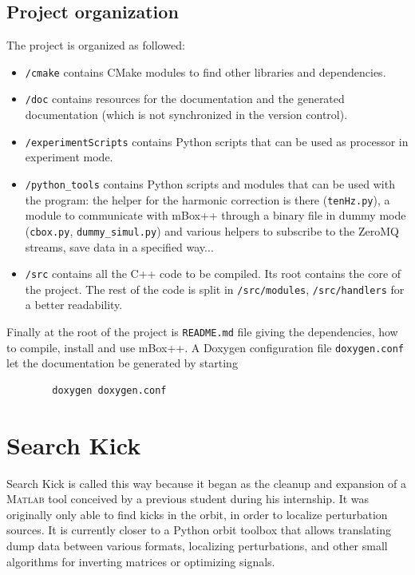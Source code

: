 \section{Project organization}
The project is organized as followed:
\begin{itemize}
    \item \texttt{/cmake} contains CMake modules to find other libraries and dependencies.
    \item \texttt{/doc} contains resources for the documentation and the generated documentation (which is not synchronized in the version control).
    \item \texttt{/experimentScripts} contains Python scripts that can be used as processor in experiment mode.
    \item \texttt{/python\_tools} contains Python scripts and modules that can be used with the program: the helper for the harmonic correction is there (\texttt{tenHz.py}), a module to communicate with mBox++ through a binary file in dummy mode (\texttt{cbox.py}, \texttt{dummy\_simul.py}) and various helpers to subscribe to the ZeroMQ streams, save data in a specified way...
    \item \texttt{/src} contains all the C++ code to be compiled. Its root contains the core of the project. The rest of the code is split in \texttt{/src/modules}, \texttt{/src/handlers} for a better readability.     
    \end{itemize}
    Finally at the root of the project is \texttt{README.md} file giving the dependencies, how to compile, install and use mBox++. A Doxygen configuration file \texttt{doxygen.conf} let the documentation be generated by starting
    \begin{verbatim}
        doxygen doxygen.conf
    \end{verbatim}
    
\chapter{Search Kick}
Search Kick is called this way because it began as the cleanup and expansion of a \textsc{Matlab} tool conceived by a previous student during his internship. It was originally only able to find kicks in the orbit, in order to localize perturbation sources. It is currently closer to a Python orbit toolbox that allows translating dump data between various formats, localizing perturbations, and other small algorithms for inverting matrices or optimizing signals.


    